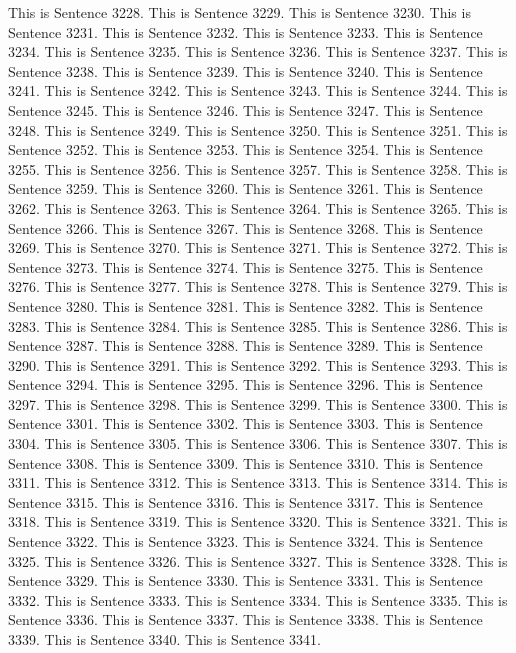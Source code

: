 \documentclass{article}
\begin{document}
This is Sentence 3228.
This is Sentence 3229.
This is Sentence 3230.
This is Sentence 3231.
This is Sentence 3232.
This is Sentence 3233.
This is Sentence 3234.
This is Sentence 3235.
This is Sentence 3236.
This is Sentence 3237.
This is Sentence 3238.
This is Sentence 3239.
This is Sentence 3240.
This is Sentence 3241.
This is Sentence 3242.
This is Sentence 3243.
This is Sentence 3244.
This is Sentence 3245.
This is Sentence 3246.
This is Sentence 3247.
This is Sentence 3248.
This is Sentence 3249.
This is Sentence 3250.
This is Sentence 3251.
This is Sentence 3252.
This is Sentence 3253.
This is Sentence 3254.
This is Sentence 3255.
This is Sentence 3256.
This is Sentence 3257.
This is Sentence 3258.
This is Sentence 3259.
This is Sentence 3260.
This is Sentence 3261.
This is Sentence 3262.
This is Sentence 3263.
This is Sentence 3264.
This is Sentence 3265.
This is Sentence 3266.
This is Sentence 3267.
This is Sentence 3268.
This is Sentence 3269.
This is Sentence 3270.
This is Sentence 3271.
This is Sentence 3272.
This is Sentence 3273.
This is Sentence 3274.
This is Sentence 3275.
This is Sentence 3276.
This is Sentence 3277.
This is Sentence 3278.
This is Sentence 3279.
This is Sentence 3280.
This is Sentence 3281.
This is Sentence 3282.
This is Sentence 3283.
This is Sentence 3284.
This is Sentence 3285.
This is Sentence 3286.
This is Sentence 3287.
This is Sentence 3288.
This is Sentence 3289.
This is Sentence 3290.
This is Sentence 3291.
This is Sentence 3292.
This is Sentence 3293.
This is Sentence 3294.
This is Sentence 3295.
This is Sentence 3296.
This is Sentence 3297.
This is Sentence 3298.
This is Sentence 3299.
This is Sentence 3300.
This is Sentence 3301.
This is Sentence 3302.
This is Sentence 3303.
This is Sentence 3304.
This is Sentence 3305.
This is Sentence 3306.
This is Sentence 3307.
This is Sentence 3308.
This is Sentence 3309.
This is Sentence 3310.
This is Sentence 3311.
This is Sentence 3312.
This is Sentence 3313.
This is Sentence 3314.
This is Sentence 3315.
This is Sentence 3316.
This is Sentence 3317.
This is Sentence 3318.
This is Sentence 3319.
This is Sentence 3320.
This is Sentence 3321.
This is Sentence 3322.
This is Sentence 3323.
This is Sentence 3324.
This is Sentence 3325.
This is Sentence 3326.
This is Sentence 3327.
This is Sentence 3328.
This is Sentence 3329.
This is Sentence 3330.
This is Sentence 3331.
This is Sentence 3332.
This is Sentence 3333.
This is Sentence 3334.
This is Sentence 3335.
This is Sentence 3336.
This is Sentence 3337.
This is Sentence 3338.
This is Sentence 3339.
This is Sentence 3340.
This is Sentence 3341.
\end{document}
